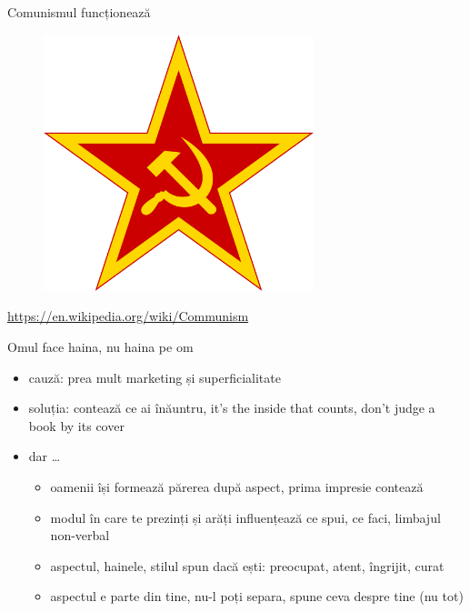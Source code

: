 \documentclass{beamer}
\begin{document}
\begin{frame}{Comunismul funcționează}
  \centering
  \begin{figure}
    \includegraphics[width=0.7\textwidth]{img/communism}
  \end{figure}
  \tiny
  \url{https://en.wikipedia.org/wiki/Communism}
\end{frame}

\begin{frame}{Omul face haina, nu haina pe om}
  \begin{itemize}
    \pause \item cauză: prea mult marketing și superficialitate
    \pause \item soluția: contează ce ai înăuntru, it's the inside that counts, don't judge a book by its cover
    \pause \item dar \ldots
      \begin{itemize}
        \pause \item oamenii își formează părerea după aspect, prima impresie contează
        \pause \item modul în care te prezinți și arăți influențează ce spui, ce faci, limbajul non-verbal
        \pause \item aspectul, hainele, stilul spun dacă ești: preocupat, atent, îngrijit, curat
        \pause \item aspectul e parte din tine, nu-l poți separa, spune ceva despre tine (nu tot)
      \end{itemize}
  \end{itemize}
\end{frame}
\end{document}
